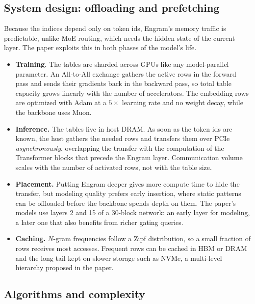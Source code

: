 \subsection{System design: offloading and prefetching}

Because the indices depend only on token ids, Engram's memory traffic is predictable, unlike MoE
routing, which needs the hidden state of the current layer. The paper exploits this in both phases
of the model's life.
\begin{itemize}
  \item \textbf{Training.} The tables are sharded across GPUs like any model-parallel parameter. An
        All-to-All exchange gathers the active rows in the forward pass and sends their gradients
        back in the backward pass, so total table capacity grows linearly with the number of
        accelerators. The embedding rows are optimized with Adam at a $5\times$ learning rate and no
        weight decay, while the backbone uses Muon.
  \item \textbf{Inference.} The tables live in host DRAM. As soon as the token ids are known, the
        host gathers the needed rows and transfers them over PCIe \emph{asynchronously}, overlapping
        the transfer with the computation of the Transformer blocks that precede the Engram layer.
        Communication volume scales with the number of activated rows, not with the table size.
  \item \textbf{Placement.} Putting Engram deeper gives more compute time to hide the transfer, but
        modeling quality prefers early insertion, where static patterns can be offloaded before the
        backbone spends depth on them. The paper's models use layers 2 and 15 of a 30-block network:
        an early layer for modeling, a later one that also benefits from richer gating queries.
  \item \textbf{Caching.} $N$-gram frequencies follow a Zipf distribution, so a small fraction of
        rows receives most accesses. Frequent rows can be cached in HBM or DRAM and the long tail
        kept on slower storage such as NVMe, a multi-level hierarchy proposed in the paper.
\end{itemize}

\subsection{Algorithms and complexity}

